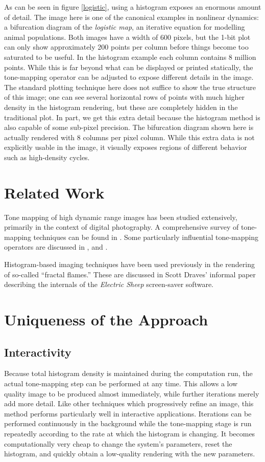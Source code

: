 \documentclass[letterpaper, 12pt]{article}
\begin{document}
As can be seen in figure \ref{logistic}, using a histogram exposes an enormous amount of
detail.  The image here is one of the canonical examples in nonlinear dynamics: a bifurcation
diagram of the \emph{logistic map}, an iterative equation for modelling animal populations.
Both images have a width of 600 pixels, but the 1-bit plot can only show approximately 200
points per column before things become too saturated to be useful.  In the histogram example
each column contains 8 million points.  While this is far beyond what can be displayed or
printed statically, the tone-mapping operator can be adjusted to expose different details
in the image.  The standard plotting technique here does not suffice to show the true structure
of this image;  one can see several horizontal rows of points with much higher density in
the histogram rendering, but these are completely hidden in the traditional plot.  In part,
we get this extra detail because the histogram method is also capable of some sub-pixel
precision.  The bifurcation diagram shown here is actually rendered with 8 columns per pixel
column.  While this extra data is not explicitly usable in the image, it visually exposes
regions of different behavior such as high-density cycles.

\section{Related Work}
Tone mapping of high dynamic range images has been studied extensively, primarily in the
context of digital photography.  A comprehensive survey of tone-mapping techniques can be
found in \cite{kd}.  Some particularly influential tone-mapping operators are discussed
in \cite{jt}, \cite{jtjhbg} and \cite{gw}.

Histogram-based imaging techniques have been used previously in the rendering of so-called
``fractal flames.''  These are discussed in Scott Draves' informal paper describing the
internals of the \emph{Electric Sheep} screen-saver software\cite{sd}.

\section{Uniqueness of the Approach}

\subsection{Interactivity}
Because total histogram density is maintained during the computation run, the actual
tone-mapping step can be performed at any time.  This allows a low quality image to
be produced almost immediately, while further iterations merely add more detail.  Like
other techniques which progressively refine an image, this method performs particularly
well in interactive applications.  Iterations can be performed continuously in the
background while the tone-mapping stage is run repeatedly according to the rate at which
the histogram is changing.  It becomes computationally very cheap to change the system's
parameters, reset the histogram, and quickly obtain a low-quality rendering with the
new parameters.
\end{document}
